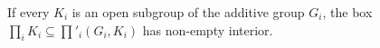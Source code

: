 If every $K_i$ is an open subgroup of the additive group $G_i$, the box $\prod_iK_i\subseteq\prod'_i(G_i,K_i)$ has non-empty interior.

